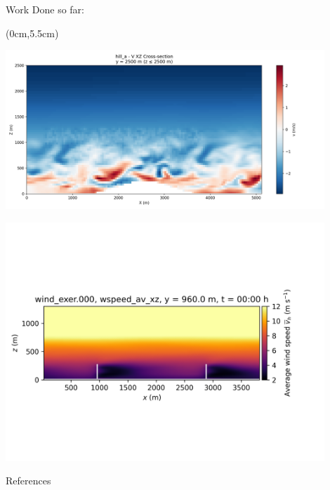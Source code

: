 \documentclass[aspectratio=1610]{beamer}
\begin{document}
\begin{frame}{Work Done so far:}
\begin{textblock*}{\textwidth}(0cm,5.5cm)
    \begin{minipage}{0.48\textwidth}
        \centering
        \includegraphics[width=0.9\textwidth]{hill.png}
    \end{minipage}
    \hfill
    \begin{minipage}{0.48\textwidth}
        \hspace{0.5cm} %
        \centering
        \includegraphics[width=0.9\textwidth]{wtm.png}
    \end{minipage}
\end{textblock*}
\end{frame}
\begin{frame}{References}
    \printbibliography
\end{frame}
\end{document}

